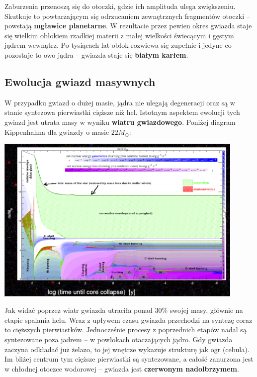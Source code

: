 \documentclass[../index.tex]{subfiles}
\begin{document}
            Zaburzenia przenoszą się do otoczki, gdzie ich amplituda ulega zwiększeniu. Skutkuje to powtarzającym się odrzucaniem zewnętrznych fragmentów otoczki – powstają \textbf{mgławice planetarne}. W rezultacie przez pewien okres gwiazda staje się wielkim obłokiem rzadkiej materii z małej wielkości świecącym i gęstym jądrem wewnątrz. Po tysiącach lat obłok rozwiewa się zupełnie i jedyne co pozostaje to owo jądra – gwiazda staje się \textbf{białym karłem}.
        \subsection{Ewolucja gwiazd masywnych}
            W przypadku gwiazd o dużej masie, jądra nie ulegają degeneracji oraz są w stanie syntezowa pierwiastki cięższe niż hel. Istotnym aspektem ewolucji tych gwiazd jest utrata masy w wyniku \textbf{wiatru gwiazdowego}. Poniżej diagram Kippenhahna dla gwiazdy o masie \(22 M_\odot\):
            \begin{center}
                \includegraphics[width=12cm]{images/KippenhahnDiagram.png}
            \end{center}
            Jak widać poprzez wiatr gwiazda utraciła ponad 30\% swojej masy, głównie na etapie spalania helu. Wraz z upływem czasu gwiazda przechodzi na syntezę coraz to cięższych pierwiastków. Jednocześnie procesy z poprzednich etapów nadal są syntezowane poza jadrem – w powłokach otaczających jądro. Gdy gwiazda zaczyna odkładać już żelazo, to jej wnętrze wykazuje strukturę jak ogr (cebula). Im bliżej centrum tym cięższe pierwiastki są syntezowane, a całość zanurzona jest w chłodnej otoczce wodorowej – gwiazda jest \textbf{czerwonym nadolbrzymem}.
\end{document}
